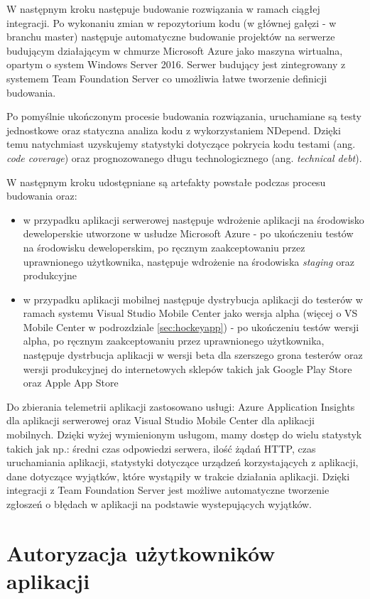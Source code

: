 W następnym kroku następuje budowanie rozwiązania w ramach ciągłej integracji. Po wykonaniu zmian w repozytorium kodu (w głównej gałęzi - w branchu master) następuje automatyczne budowanie projektów na serwerze budującym działającym w chmurze Microsoft Azure jako maszyna wirtualna, opartym o system Windows Server 2016. Serwer budujący jest zintegrowany z systemem Team Foundation Server co umożliwia łatwe tworzenie definicji budowania. 

Po pomyślnie ukończonym procesie budowania rozwiązania, uruchamiane są testy jednostkowe oraz statyczna analiza kodu z wykorzystaniem NDepend. Dzięki temu natychmiast uzyskujemy statystyki dotyczące pokrycia kodu testami (ang. \textit{code coverage}) oraz prognozowanego długu technologicznego (ang. \textit{technical debt}).

W następnym kroku udostępniane są artefakty powstałe podczas procesu budowania oraz:
\begin{itemize}
\item w przypadku aplikacji serwerowej następuje wdrożenie aplikacji na środowisko deweloperskie utworzone w usłudze Microsoft Azure - po ukończeniu testów na środowisku deweloperskim, po ręcznym zaakceptowaniu przez uprawnionego użytkownika, następuje wdrożenie na środowiska \textit{staging} oraz produkcyjne
\item w przypadku aplikacji mobilnej następuje dystrybucja aplikacji do testerów w ramach systemu Visual Studio Mobile Center jako wersja alpha (więcej o VS Mobile Center w podrozdziale \ref{sec:hockeyapp}) - po ukończeniu testów wersji alpha, po ręcznym zaakceptowaniu przez uprawnionego użytkownika, następuje dystrbucja aplikacji w wersji beta dla szerszego grona testerów oraz wersji produkcyjnej do internetowych sklepów takich jak Google Play Store oraz Apple App Store
\end{itemize}

Do zbierania telemetrii aplikacji zastosowano usługi: Azure Application Insights dla aplikacji serwerowej oraz Visual Studio Mobile Center dla aplikacji mobilnych. Dzięki wyżej wymienionym usługom, mamy dostęp do wielu statystyk takich jak np.: średni czas odpowiedzi serwera, ilość żądań HTTP, czas uruchamiania aplikacji, statystyki dotyczące urządzeń korzystających z aplikacji, dane dotyczące wyjątków, które wystąpiły w trakcie działania aplikacji. Dzięki integracji z Team Foundation Server jest możliwe automatyczne tworzenie zgłoszeń o błędach w aplikacji na podstawie wystepujących wyjątków.
\section{Autoryzacja użytkowników aplikacji}
